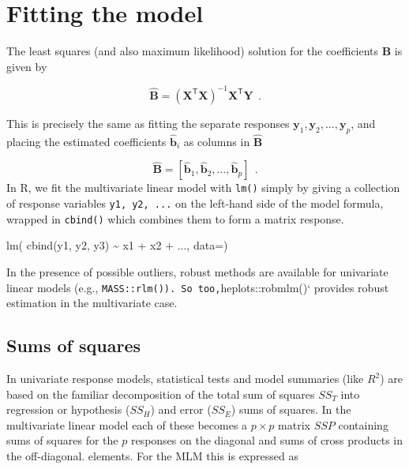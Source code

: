\documentclass[
  letterpaper,
  10pt,
  krantz2]{krantz}
\makeatletter
\newenvironment{Shaded}{\begin{snugshade}}{\end{snugshade}}
\newcommand{\AttributeTok}[1]{\textcolor[rgb]{0.40,0.45,0.13}{#1}}
\newcommand{\FunctionTok}[1]{\textcolor[rgb]{0.28,0.35,0.67}{#1}}
\newcommand{\NormalTok}[1]{\textcolor[rgb]{0.00,0.23,0.31}{#1}}
\newcommand{\SpecialCharTok}[1]{\textcolor[rgb]{0.37,0.37,0.37}{#1}}
\newenvironment{kframe}{%
  \medskip{}
  \setlength{\fboxsep}{.8em}
  \def\at@end@of@kframe{}%
  \ifinner\ifhmode%
  \def\at@end@of@kframe{\end{minipage}}%
  \begin{minipage}{\columnwidth}%
  \fi\fi%
  \def\FrameCommand##1{\hskip\@totalleftmargin \hskip-\fboxsep
  \colorbox{shadecolor}{##1}\hskip-\fboxsep
      \hskip-\linewidth \hskip-\@totalleftmargin \hskip\columnwidth}%
  \MakeFramed {\advance\hsize-\width
    \@totalleftmargin\z@ \linewidth\hsize
    \@setminipage}}%
{\par\unskip\endMakeFramed%
  \at@end@of@kframe}
\renewenvironment{Shaded}{\begin{kframe}}{\end{kframe}}
\makeatother
\begin{document}
\section{Fitting the model}\label{fitting-the-model}

The least squares (and also maximum likelihood) solution for the
coefficients \(\mathbf{B}\) is given by

\[
\widehat{\mathbf{B}} = (\mathbf{X}^\mathsf{T} \mathbf{X})^{-1} \mathbf{X}^\mathsf{T} \mathbf{Y} \:\: .
\]

This is precisely the same as fitting the separate responses
\(\mathbf{y}_1 , \mathbf{y}_2 , \dots , \mathbf{y}_p\), and placing the
estimated coefficients \(\widehat{\mathbf{b}}_i\) as columns in
\(\widehat{\mathbf{B}}\)

\[
\widehat{\mathbf{B}} = [ \widehat{\mathbf{b}}_1, \widehat{\mathbf{b}}_2, \dots , \widehat{\mathbf{b}}_p] \:\: .
\] In R, we fit the multivariate linear model with \texttt{lm()} simply
by giving a collection of response variables \texttt{y1,\ y2,\ ...} on
the left-hand side of the model formula, wrapped in \texttt{cbind()}
which combines them to form a matrix response.

\begin{Shaded}
\begin{Highlighting}[]
\FunctionTok{lm}\NormalTok{( }\FunctionTok{cbind}\NormalTok{(y1, y2, y3) }\SpecialCharTok{\textasciitilde{}}\NormalTok{ x1 }\SpecialCharTok{+}\NormalTok{ x2 }\SpecialCharTok{+}\NormalTok{ ..., }\AttributeTok{data=}\NormalTok{)}
\end{Highlighting}
\end{Shaded}

In the presence of possible outliers, robust methods are available for
univariate linear models (e.g.,
\texttt{MASS::rlm()).\ So\ too,}heplots::robmlm()` provides robust
estimation in the multivariate case.

\subsection{Sums of squares}\label{sums-of-squares}

In univariate response models, statistical tests and model summaries
(like \(R^2\)) are based on the familiar decomposition of the total sum
of squares \(SS_T\) into regression or hypothesis (\(SS_H\)) and error
(\(SS_E\)) sums of squares. In the multivariate linear model each of
these becomes a \(p \times p\) matrix \(SSP\) containing sums of squares
for the \(p\) responses on the diagonal and sums of cross products in
the off-diagonal. elements. For the MLM this is expressed as
\end{document}
